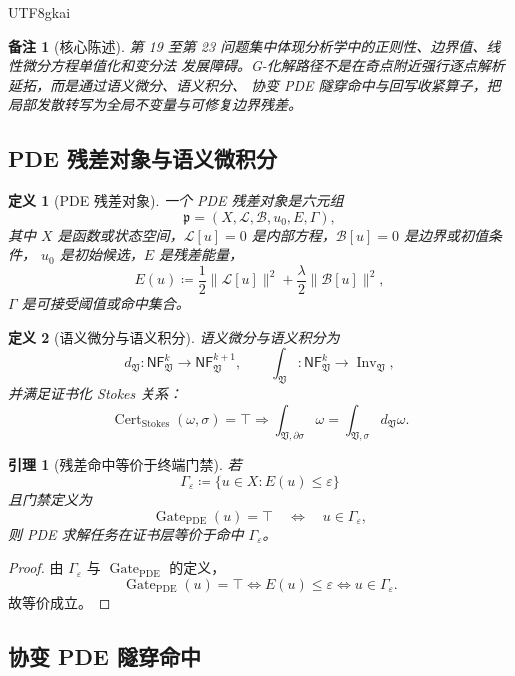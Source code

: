 \documentclass[12pt]{article}
\newtheorem{definition}{定义}[section]
\newtheorem{lemma}{引理}[section]
\newtheorem{remark}{备注}[section]
\newcommand{\Vsys}{\mathfrak V}
\newcommand{\NF}{\mathsf{NF}}
\newcommand{\DefEq}{\coloneqq}
\newcommand{\Lcal}{\mathcal{L}}
\newcommand{\Bcal}{\mathcal{B}}
\newcommand{\eps}{\varepsilon}
\DeclareMathOperator{\Cert}{Cert}
\DeclareMathOperator{\Gate}{Gate}
\DeclareMathOperator{\Inv}{Inv}
\DeclareMathOperator{\PDE}{PDE}
\begin{document}
\begin{CJK*}{UTF8}{gkai}
\begin{remark}[核心陈述]
第 19 至第 23 问题集中体现分析学中的正则性、边界值、线性微分方程单值化和变分法
发展障碍。G-化解路径不是在奇点附近强行逐点解析延拓，而是通过语义微分、语义积分、
协变 PDE 隧穿命中与回写收紧算子，把局部发散转写为全局不变量与可修复边界残差。
\end{remark}

\subsection{PDE 残差对象与语义微积分}
\label{subsec:tex59-pde-object}

\begin{definition}[PDE 残差对象]
\label{def:tex59-pde-object}
一个 PDE 残差对象是六元组
\[
  \mathfrak p
  =
  (X,\Lcal,\Bcal,u_0,E,\Gamma),
\]
其中 \(X\) 是函数或状态空间，\(\Lcal[u]=0\) 是内部方程，\(\Bcal[u]=0\) 是边界或初值条件，
\(u_0\) 是初始候选，\(E\) 是残差能量，
\[
  E(u)
  \DefEq
  \frac12\|\Lcal[u]\|^2+\frac{\lambda}{2}\|\Bcal[u]\|^2,
\]
\(\Gamma\) 是可接受阈值或命中集合。
\end{definition}

\begin{definition}[语义微分与语义积分]
\label{def:tex59-semantic-calculus}
语义微分与语义积分为
\[
  d_{\Vsys}:\NF_{\Vsys}^{k}\longrightarrow \NF_{\Vsys}^{k+1},
  \qquad
  \int_{\Vsys}:\NF_{\Vsys}^{k}\longrightarrow \Inv_{\Vsys},
\]
并满足证书化 Stokes 关系：
\[
  \Cert_{\mathrm{Stokes}}(\omega,\sigma)=\top
  \Longrightarrow
  \int_{\Vsys,\partial\sigma}\omega
  =
  \int_{\Vsys,\sigma}d_{\Vsys}\omega.
\]
\end{definition}

\begin{lemma}[残差命中等价于终端门禁]
\label{lem:tex59-residual-hit}
若
\[
  \Gamma_{\eps}\DefEq\{u\in X:E(u)\le\eps\}
\]
且门禁定义为
\[
  \Gate_{\PDE}(u)=\top
  \quad\Longleftrightarrow\quad
  u\in\Gamma_{\eps},
\]
则 PDE 求解任务在证书层等价于命中 \(\Gamma_{\eps}\)。
\end{lemma}

\begin{proof}
由 \(\Gamma_{\eps}\) 与 \(\Gate_{\PDE}\) 的定义，
\[
  \Gate_{\PDE}(u)=\top
  \Longleftrightarrow
  E(u)\le\eps
  \Longleftrightarrow
  u\in\Gamma_{\eps}.
\]
故等价成立。
\end{proof}

\subsection{协变 PDE 隧穿命中}
\label{subsec:tex59-pde-tunnel}


\end{CJK*}
\end{document}
